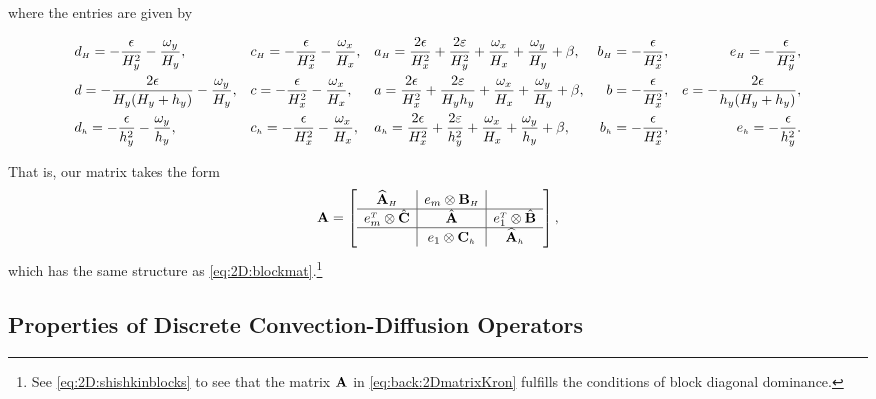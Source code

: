 where the entries are given by
\begin{scriptsize}
\begin{align}
\hspace{-3em}
	&\entryvS  =  - \frac{\epsilon}{H_y^{2}}-\frac{\omega_y}{H_y},&
    &\entryvW  =  -\frac{\epsilon}{H_x^{2}}- \frac{\omega_x}{H_x},&
    &\entryvC  =  \frac{2\epsilon}{H_x^{2}} +\frac{2\varepsilon}{H_y^{2}} +\frac{\omega_x}{H_x}+\frac{\omega_y}{H_y}+\beta,
    &\entryvE  =  -\frac{\epsilon}{H_x^{2}}, &
    &\entryvN  =  - \frac{\epsilon}{H_y^{2}}, \\
    &\entryzS  =  - \frac{2\epsilon}{H_y(H_y+h_y)}-\frac{\omega_y}{H_y},&
    &\entryzW  =  -\frac{\epsilon}{H_x^{2}} - \frac{\omega_x}{H_x},&
    &\entryzC  =  \frac{2\epsilon}{H_x^{2}} +\frac{2\varepsilon}{H_yh_y} +\frac{\omega_x}{H_x}+\frac{\omega_y}{H_y}+\beta,
    &\entryzE  =  -\frac{\epsilon}{H_x^{2}}, &
    &\entryzN  =  - \frac{2\epsilon}{h_y(H_y+h_y)},\label{eq:back:upwind2D}\\
    &\entrywS  =  - \frac{\epsilon}{h_y^{2}}-\frac{\omega_y}{h_y},&
    &\entrywW  =  -\frac{\epsilon}{H_x^{2}}- \frac{\omega_x}{H_x},&
    &\entrywC  =  \frac{2\epsilon}{H_x^{2}} +\frac{2\varepsilon}{h_y^{2}} +\frac{\omega_x}{H_x}+\frac{\omega_y}{h_y}+\beta,
    &\entrywE  =  -\frac{\epsilon}{H_x^{2}}, &
    &\entrywN  =  - \frac{\epsilon}{h_y^{2}}.
\end{align}
\end{scriptsize}
That is, our matrix takes the form
\begin{equation}
\label{eq:back:2DmatrixKron}
\mathbf{A}=\left[
  \begin{array}{c|c|c}
             \widehat{\mathbf{A}}_{\scriptscriptstyle H}         & e_{m}\otimes\mathbf{B}_{\scriptscriptstyle H}   &                           \\ \hline
    e_{m}^{\scriptscriptstyle T}\otimes\hat{\mathbf{C}}  &   \hat{\mathbf{A}}            & e_{1}^{\scriptscriptstyle T}\otimes\hat{\mathbf{B}} \\ \hline
                               & e_{1}\otimes\mathbf{C}_{\scriptscriptstyle h}   &        \widehat{\mathbf{A}}_{\scriptscriptstyle h}  \\
  \end{array}
\right],
\end{equation}
which has the same structure as \eqref{eq:2D:blockmat}.\footnote{See \eqref{eq:2D:shishkinblocks} to see that the matrix $\mathbf{A}$ in \eqref{eq:back:2DmatrixKron} fulfills the conditions of block diagonal dominance.}



\subsection{Properties of Discrete Convection-Diffusion Operators}
\label{back:convdiff:A}


